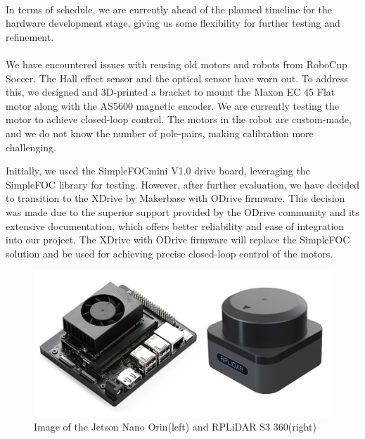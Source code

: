 \paragraph*{}
In terms of schedule, we are currently ahead of the planned timeline for the hardware development stage, giving us some flexibility for further testing and refinement.

\paragraph*{}
We have encountered issues with reusing old motors and robots from RoboCup Soccer. The Hall effect sensor and the optical sensor have worn out. To address this, we designed and 3D-printed a bracket to mount the Maxon EC 45 Flat motor along with the AS5600 magnetic encoder. We are currently testing the motor to achieve closed-loop control. The motors in the robot are custom-made, and we do not know the number of pole-pairs, making calibration more challenging. 

Initially, we used the SimpleFOCmini V1.0 drive board, leveraging the SimpleFOC library for testing. However, after further evaluation, we have decided to transition to the XDrive by Makerbase with ODrive firmware. This decision was made due to the superior support provided by the ODrive community and its extensive documentation, which offers better reliability and ease of integration into our project. The XDrive with ODrive firmware will replace the SimpleFOC solution and be used for achieving precise closed-loop control of the motors.
\begin{figure}
    \centering
    \includegraphics[width=0.5\linewidth]{midpoint_report//assets//images//hardware/JetsonNano+RPLiDAR.png}
    \caption{Image of the Jetson Nano Orin(left) and RPLiDAR S3 360(right)}
    \label{fig:enter-label}
\end{figure}
